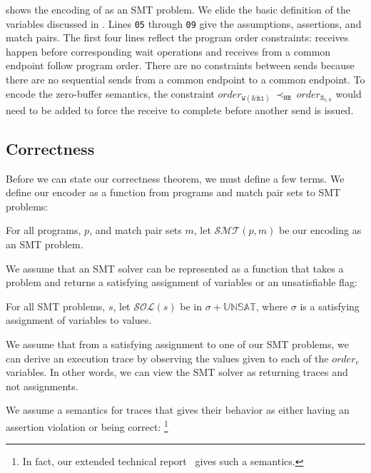  shows the encoding of  as an
SMT problem. We elide the basic definition of the variables discussed
in . Lines \texttt{05} through \texttt{09} give
the assumptions, assertions, and match pairs. The first four lines
reflect the program order constraints: receives happen before
corresponding wait operations and receives from a common endpoint follow
program order. There are no constraints between sends because there are no sequential sends from a common endpoint to a common endpoint. To encode the zero-buffer semantics, the constraint
$\mathit{order}_\mathtt{W(\&h1)}\ \mathrm{\prec_\mathtt{HB}}\ \mathit{order}_\mathtt{S_{1,5}}$
would need to be added to force the receive to complete before another
send is issued.

\subsection{Correctness}

Before we can state our correctness theorem, we must define a few
terms. We define our encoder as a function from programs and match pair sets
to SMT problems:

\begin{definition}[Encoder]
For all programs, $p$, and match pair sets $m$, let $\mathcal{SMT}(p,
m)$ be our encoding as an SMT problem.
\end{definition}

We assume that an SMT solver can be represented as a function that
takes a problem and returns a satisfying assignment of variables or an
unsatisfiable flag:

\begin{definition}
For all SMT problems, $s$, let $\mathcal{SOL}(s)$ be in $\sigma +
\mathbb{UNSAT}$, where $\sigma$ is a satisfying assignment of
variables to values.
\end{definition}

We assume that from a satisfying assignment to one of our SMT
problems, we can derive an execution trace by observing the values
given to each of the $\textit{order}_{e}$ variables. In other words,
we can view the SMT solver as returning traces and not assignments.

We assume a semantics for traces that gives their behavior as either
having an assertion violation or being correct: \footnote{In fact, our
  extended technical report~\cite{extended-version} gives such a
  semantics.}

